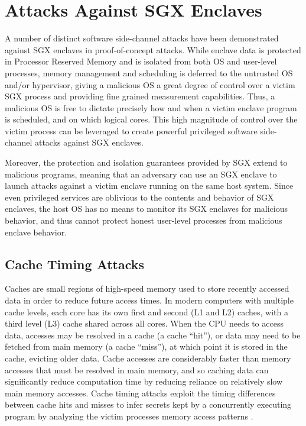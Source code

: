 \section{Attacks Against SGX Enclaves}

A number of distinct software side-channel attacks have been demonstrated against SGX enclaves in proof-of-concept attacks. While enclave data is protected in Processor Reserved Memory and is isolated from both OS and user-level processes, memory management and scheduling is deferred to the untrusted OS and/or hypervisor, giving a malicious OS a great degree of control over a victim SGX process and providing fine grained measurement capabilities. Thus, a malicious OS is free to dictate precisely how and when a victim enclave program is scheduled, and on which logical cores. This high magnitude of control over the victim process can be leveraged to create powerful privileged software side-channel attacks against SGX enclaves. 

Moreover, the protection and isolation guarantees provided by SGX extend to malicious programs, meaning that an adversary can use an SGX enclave to launch attacks against a victim enclave running on the same host system. Since even privileged services are oblivious to the contents and behavior of SGX enclaves, the host OS has no means to monitor its SGX enclaves for malicious behavior, and thus cannot protect honest user-level processes from malicious enclave behavior.

\subsection{Cache Timing Attacks}

Caches are small regions of high-speed memory used to store recently accessed data in order to reduce future access times. In modern computers with multiple cache levels, each core has its own first and second (L1 and L2) caches, with a third level (L3) cache shared across all cores. When the CPU needs to access data, accesses may be resolved in a cache (a cache ``hit''), or data may need to be fetched from main memory (a cache ``miss''), at which point it is stored in the cache, evicting older data. Cache accesses are considerably faster than memory accesses that must be resolved in main memory, and so caching data can significantly reduce computation time by reducing reliance on relatively slow main memory accesses. Cache timing attacks exploit the timing differences between cache hits and misses to infer secrets kept by a concurrently executing program by analyzing the victim processes memory access patterns \cite{costan_intel_2016, moghimi_cachezoom:_2017}.  

